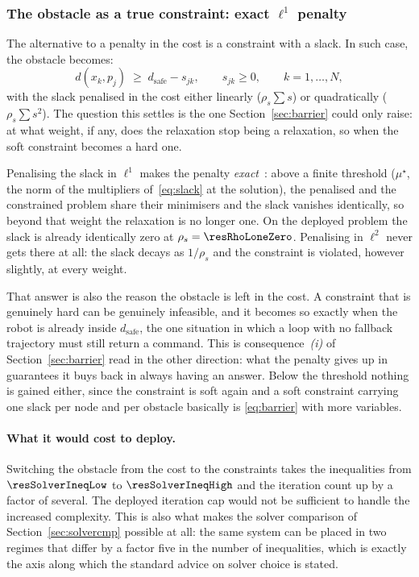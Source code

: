 \documentclass[11pt,a4paper]{article}
\newcommand{\dsafe}{d_{\mathrm{safe}}}
\begin{document}
\subsubsection{The obstacle as a true constraint: exact \texorpdfstring{$\ell^1$}{l1} penalty}
\label{sec:l1}

The alternative to a penalty in the cost is a constraint with a slack. In such case, the obstacle becomes:
\begin{equation}
  d(x_k,p_j)\;\ge\;\dsafe-s_{jk},\qquad s_{jk}\ge0,\qquad k=1,\dots,N,
  \label{eq:slack}
\end{equation}
with the slack penalised in the cost either linearly ($\rho_s\sum s$) or quadratically ($\rho_s\sum s^2$). The
question this settles is the one Section~\ref{sec:barrier} could only raise: at what weight, if any, does the
relaxation stop being a relaxation, so when the soft constraint becomes a hard one.

Penalising the slack in $\ell^1$ makes the penalty \emph{exact}~\cite{fagiano2025noc}: above a finite threshold ($\mu^\star$,
the norm of the multipliers of~\eqref{eq:slack} at the solution), the penalised and the constrained
problem share their minimisers and the slack vanishes identically, so beyond that weight the relaxation is no longer one.
On the deployed problem the slack is already identically zero at $\rho_s=\resRhoLoneZero$. Penalising in
$\ell^2$ never gets there at all: the slack decays as $1/\rho_s$ and the constraint is violated, however
slightly, at every weight.

That answer is also the reason the obstacle is left in the cost. A constraint that is genuinely hard can be
genuinely infeasible, and it becomes so exactly when the robot is already inside $\dsafe$, the one
situation in which a loop with no fallback trajectory must still return a command. This is
consequence~\emph{(i)} of Section~\ref{sec:barrier} read in the other direction: what the penalty gives up
in guarantees it buys back in always having an answer. Below the threshold nothing is gained either, since
the constraint is soft again and a soft constraint carrying one slack per node and per obstacle basically is
\eqref{eq:barrier} with more variables.

\paragraph{What it would cost to deploy.} Switching the obstacle from the cost to the constraints takes the
inequalities from $\resSolverIneqLow$ to $\resSolverIneqHigh$ and the iteration count up by a factor of
several. The deployed iteration cap would not be sufficient to handle the increased complexity. This is also what makes the solver comparison of
Section~\ref{sec:solvercmp} possible at all: the same system can be placed in two regimes that differ by a
factor five in the number of inequalities, which is exactly the axis along which the standard advice on
solver choice is stated.
\end{document}
